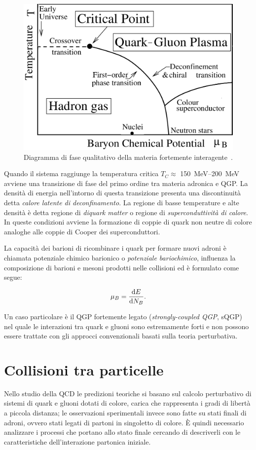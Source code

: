     \begin{figure}[h]
        \centering
        \includegraphics[width=0.7\linewidth]{res/fig/1-chapter/3-PhasDiagQGP.png}
        \caption{Diagramma di fase qualitativo della materia fortemente interagente~\cite{Wikipedia_PhasDiagQGP}.}
        \label{fig:3-phase-diag-qgp}
    \end{figure}
    
    Quando il sistema raggiunge la temperatura critica $T_C \approx$ \qtyrange[range-phrase = --, range-units = single]{150}{200}{\mega \eV} avviene una transizione di fase del primo ordine tra materia adronica e QGP. La densità di energia nell'intorno di questa transizione presenta una discontinuità detta \textit{calore latente di deconfinamento}. La regione di basse temperature e alte densità è detta regione di \textit{diquark matter} o regione di \textit{superconduttività di calore}. In queste condizioni avviene la formazione di coppie di quark non neutre di colore analoghe alle coppie di Cooper dei superconduttori.

    La capacità dei barioni di ricombinare i quark per formare nuovi adroni è chiamata potenziale chimico barionico o \textit{potenziale bariochimico}, influenza la composizione di barioni e mesoni prodotti nelle collisioni ed è formulato come segue:
    
    \begin{equation}
        \mu_B = \dv{E}{N_B}.
    \end{equation}

    Un caso particolare è il QGP fortemente legato (\textit{strongly-coupled QGP}, sQGP) nel quale le interazioni tra quark e gluoni sono estremamente forti e non possono essere trattate con gli approcci convenzionali basati sulla teoria perturbativa.

\section{Collisioni tra particelle}
\label{sec:COLLISION}
    Nello studio della QCD le predizioni teoriche si basano sul calcolo perturbativo di sistemi di quark e gluoni dotati di colore, carica che rappresenta i gradi di libertà a piccola distanza; le osservazioni sperimentali invece sono fatte su stati finali di adroni, ovvero stati legati di partoni in singoletto di colore. È quindi necessario analizzare i processi che portano allo stato finale cercando di descriverli con le caratteristiche dell'interazione partonica iniziale.

